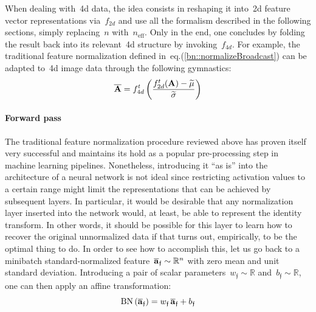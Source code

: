 \documentclass{article}
\newcommand{\mathcolorbox}[2]{\colorbox{#1}{$\displaystyle #2$}}
\begin{document}
\noindent When dealing with~4d data, the idea consists in reshaping it into~2d feature vector representations via~$f_{2d}$ and use all the formalism described in the following sections, simply replacing~$n$ with~$n_\text{eff}$.  Only in the end, one concludes by folding the result back into its relevant~4d structure by invoking~$f_{4d}$.  For example, the traditional feature normalization defined in~eq.(\ref{bn::normalizeBroadcast}) can be adapted to~4d image data through the following gymnastics:
\begin{equation*}
\overline{\bf A} = f_{4d}^t \left( \frac{f_{2d}^t({\bf A}) - \widetilde{\mu} }{\widetilde{\sigma}} \right)
\end{equation*}

\paragraph{Forward pass}  The traditional feature normalization procedure reviewed above has proven itself very successful and maintains its hold as a popular pre-processing step in machine learning pipelines.  Nonetheless, introducing it ``as is'' into the architecture of a neural network is not ideal since restricting activation values to a certain range might limit the representations that can be achieved by subsequent layers. In particular, it would be desirable that any normalization layer inserted into the network would, at least, be able to represent the identity transform.  In other words, it should be possible for this layer to learn how to recover the original unnormalized data if that turns out, empirically, to be the optimal thing to do.  In order to see how to accomplish this, let us go back to a minibatch standard-normalized feature~$\overline{\bf a}_\mathfrak{f} \sim \mathbb{R}^n$ with zero mean and unit standard deviation.  Introducing a pair of scalar parameters~$w_\mathfrak{f} \sim \mathbb{R}$ and~$b_\mathfrak{f} \sim \mathbb{R} $, one can then apply an affine transformation:
\begin{equation*}
\text{BN} \left( \overline{\bf a}_\mathfrak{f} \right) = w_\mathfrak{f} \, \overline{\bf a}_\mathfrak{f} + b_\mathfrak{f}
\end{equation*}

\newcommand\tempboxBNmean{%
\begin{minipage}{0.2\textwidth}%
\abovedisplayskip=0pt
\belowdisplayskip=0pt
\begin{align*}
\mu_{\text{BN} \left( \overline{\bf a}_\mathfrak{f} \right)} &= \frac{1}{n} \sum_\text{samples} \left( w_\mathfrak{f} \, \overline{a}_\mathfrak{f}^s + b_\mathfrak{f} \right) \\
&= w_\mathfrak{f} \left( \frac{1}{n} \sum_\text{samples} \overline{a}_\mathfrak{f}^s \right) + b_\mathfrak{f} \\
&\downarrow \mathcolorbox{light-blue}{\text{since the mean of~$\overline{\bf a}_\mathfrak{f}$ is~0 by construction}} \\
&= b_\mathfrak{f}
\end{align*}
\end{minipage}}
\end{document}
